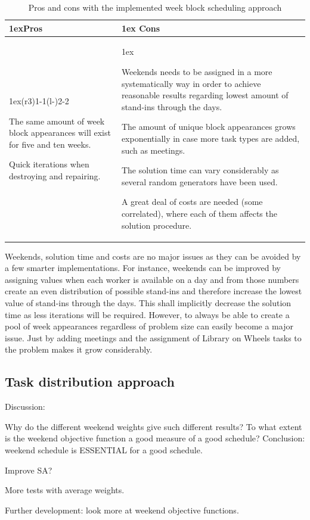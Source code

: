 \begin{table}[!h]
\caption{Pros and cons with the implemented week block scheduling approach}
\label{pros_cons_weekly_scheduling}
\begin{tabularx}{\linewidth}{>{\parskip1ex}X@{\kern4\tabcolsep}>{\parskip1ex}X}
\toprule
\hfil\bfseries Pros
&
\hfil\bfseries Cons
\\\cmidrule(r{3\tabcolsep}){1-1}\cmidrule(l{-\tabcolsep}){2-2}

The same amount of week block appearances will exist for five and ten weeks.\par
Quick iterations when destroying and repairing.\par

&

Weekends needs to be assigned in a more systematically way in order to achieve reasonable results regarding lowest amount of stand-ins through the days.\par
The amount of unique block appearances grows exponentially in case more task types are added, such as meetings.\par
The solution time can vary considerably as several random generators have been used.\par
A great deal of costs are needed (some correlated), where each of them affects the solution procedure.

\\\bottomrule
\end{tabularx}
\end{table}

 Weekends, solution time and costs are no major issues as they can be avoided by a few smarter implementations. For instance, weekends can be improved by assigning values when each worker is available on a day and from those numbers create an even distribution of possible stand-ins and therefore increase the lowest value of stand-ins through the days. This shall implicitly decrease the solution time as less iterations will be required. However, to always be able to create a pool of week appearances regardless of problem size can easily become a major issue. Just by adding meetings and the assignment of Library on Wheels tasks to the problem makes it grow considerably.
 

\subsection{Task distribution approach}
Discussion: 

Why do the different weekend weights give such different results?
To what extent is the weekend objective function a good measure of a good schedule?
Conclusion: weekend schedule is ESSENTIAL for a good schedule.

Improve SA?

More tests with average weights.

Further development: look more at weekend objective functions.
